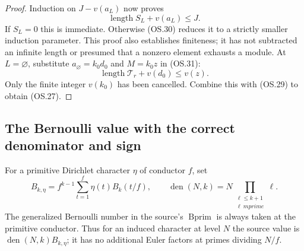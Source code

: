 \begin{proof}
Induction on $J-v(a_L)$ now proves
\[
                   \operatorname{length}S_L+v(a_L)\le J.
 \tag{OS.31}
\]
If $S_L=0$ this is immediate.  Otherwise (OS.30) reduces it to
a strictly smaller induction parameter.  This proof also establishes
finiteness; it has not subtracted an infinite length or presumed
that a nonzero element exhausts a module.
At $L=\varnothing$, substitute
$a_\varnothing=k_0d_0$ and $M=k_0z$ in (OS.31):
\[
                  \operatorname{length}\mathcal T_r+v(d_0)\le v(z).
\]
Only the finite integer $v(k_0)$ has been cancelled.
Combine this with (OS.29) to obtain (OS.27).
\end{proof}

\subsection{The Bernoulli value with the correct denominator and sign}

For a primitive Dirichlet character $\eta$ of conductor $f$, set
\[
 B_{k,\eta}=f^{k-1}\sum_{t=1}^{f}\eta(t)B_k(t/f),
 \qquad \operatorname{den}(N,k)=N\prod_{\substack{\ell\le k+1\\
                                    \ell\ {
m prime}}}\ell.
 \tag{OS.32}
\]
The generalized Bernoulli number in the source's
$\operatorname{Bprim}$ is always taken at the primitive conductor.
Thus for an induced character at level $N$ the source value is
$\operatorname{den}(N,k)B_{k,\eta}$; it has no additional Euler
factors at primes dividing $N/f$.

